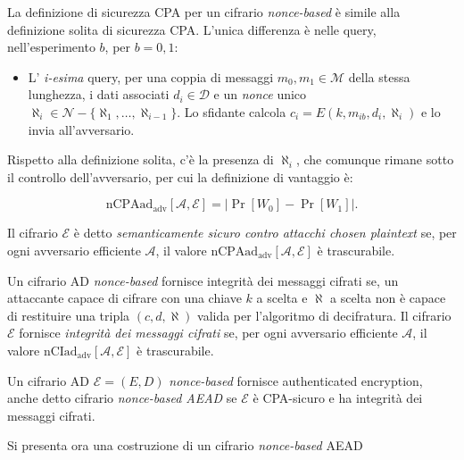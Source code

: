 \begin{definition}
    La definizione di sicurezza CPA per un cifrario \emph{nonce-based} è simile alla definizione solita di sicurezza CPA. L'unica differenza è nelle query, nell'esperimento $b$, per $b = 0,1$:

    \begin{itemize}
        \item L' \emph{i-esima} query, per una coppia di messaggi $m_0,m_1 \in \mathcal{M}$ della stessa lunghezza, i dati associati $d_i \in \mathcal{D}$ e un \emph{nonce} unico $\aleph_i \in \mathcal{N} - \{\aleph_1,\dots,\aleph_{i-1}\}$. Lo sfidante calcola $c_i = E(k,m_{ib},d_i,\aleph_i)$ e lo invia all'avversario.
    \end{itemize}
    Rispetto alla definizione solita, c'è la presenza di $\aleph_i$, che comunque rimane sotto il controllo dell'avversario, per cui la definizione di vantaggio è:

    \[
        \text{nCPAad}_{\text{adv}}[\mathcal{A},\mathcal{E}] = |\Pr[W_0] - \Pr[W_1]|.
    \]

    Il cifrario $\mathcal{E}$ è detto \emph{semanticamente sicuro contro attacchi chosen plaintext} se, per ogni avversario efficiente $\mathcal{A}$, il valore $\text{nCPAad}_{\text{adv}}[\mathcal{A},\mathcal{E}]$ è trascurabile.
\end{definition}

\begin{definition}
    Un cifrario AD \emph{nonce-based} fornisce integrità dei messaggi cifrati se, un attaccante capace di cifrare con una chiave $k$ a scelta e $\aleph$ a scelta non è capace di restituire una tripla $(c,d,\aleph)$ valida per l'algoritmo di decifratura.
    Il cifrario $\mathcal{E}$ fornisce \emph{integrità dei messaggi cifrati} se, per ogni avversario efficiente $\mathcal{A}$, il valore $\text{nCIad}_{\text{adv}}[\mathcal{A},\mathcal{E}]$ è trascurabile.
\end{definition}

\begin{definition}
    Un cifrario AD $\mathcal{E} = (E,D)$ \emph{nonce-based} fornisce authenticated encryption, anche detto cifrario \emph{nonce-based AEAD} se $\mathcal{E}$ è CPA-sicuro e ha integrità dei messaggi cifrati.
\end{definition}

Si presenta ora una costruzione di un cifrario \emph{nonce-based} AEAD

